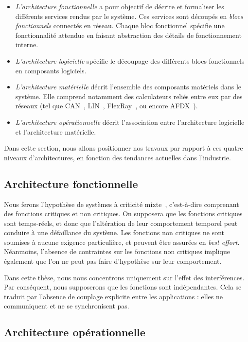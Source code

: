\begin{itemize}
	\item \emph{L'architecture fonctionnelle} a pour objectif de décrire et formaliser les différents services rendus par le système.
	Ces services sont découpés en \emph{blocs fonctionnels} connectés en réseau.
	Chaque bloc fonctionnel spécifie une fonctionnalité attendue en faisant abstraction des détails de fonctionnement interne.
	\item \emph{L'architecture logicielle} spécifie le découpage des différents blocs fonctionnels en composants logiciels.
	\item \emph{L'architecture matérielle} décrit l'ensemble des composants matériels dans le système. Elle comprend notamment des calculateurs reliés entre eux par des réseaux (tel que CAN~\cite{navet1998controller}, LIN~\cite{denuto2001lin}, FlexRay~\cite{makowitz2006flexray}, ou encore AFDX~\cite{heise2015avionics}).
	\item \emph{L'architecture opérationnelle} décrit l'association entre l'architecture logicielle et l'architecture matérielle.  
\end{itemize}

Dans cette section, nous allons positionner nos travaux par rapport à ces quatre niveaux d'architectures, en fonction des tendances actuelles dans l'industrie.

\subsection{Architecture fonctionnelle}

Nous ferons l'hypothèse de systèmes à criticité mixte~\cite{vestal2007preemptive}, c'est-à-dire comprenant des fonctions critiques et non critiques.
On supposera que les fonctions critiques sont temps-réels, et donc que l'altération de leur comportement temporel peut conduire à une défaillance du système.
Les fonctions non critiques ne sont soumises à aucune exigence particulière, et peuvent être assurées en \emph{best effort}.
Néanmoins, l'absence de contraintes sur les fonctions non critiques implique également que l'on ne peut pas faire d'hypothèse sur leur comportement.

Dans cette thèse, nous nous concentrons uniquement sur l'effet des interférences.
Par conséquent, nous supposerons que les fonctions sont indépendantes.
Cela se traduit par l'absence de couplage explicite entre les applications : elles ne communiquent et ne se synchronisent pas.

\subsection{Architecture opérationnelle}

